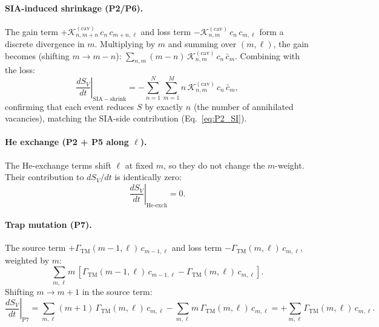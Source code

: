 \documentclass[pdflatex,sn-basic]{sn-jnl} %
\begin{document}
\paragraph{SIA-induced shrinkage (P2/P6).}
The gain term $+\mathcal{K}_{n,m+n}^{(\mathrm{cav})}\,c_n\,c_{m+n,\ell}$
and loss term $-\mathcal{K}_{n,m}^{(\mathrm{cav})}\,c_n\,c_{m,\ell}$
form a discrete divergence in $m$. Multiplying by $m$ and summing over
$(m,\ell)$, the gain becomes (shifting $m \to m-n$):
$\sum_{n,m}(m{-}n)\,\mathcal{K}_{n,m}^{(\mathrm{cav})}\,c_n\,\bar{c}_m$.
Combining with the loss:
\begin{equation}\label{eq:P2i_SV}
    \left.\frac{dS_V}{dt}\right|_{\mathrm{SIA-shrink}}
    = -\sum_{n=1}^{N}\sum_{m=1}^{M}
      n\,\mathcal{K}_{n,m}^{(\mathrm{cav})}\,c_n\,\bar{c}_m,
\end{equation}
confirming that each event reduces $S$ by exactly $n$ (the number of
annihilated vacancies), matching the SIA-side contribution
(Eq.~\ref{eq:P2_SI}).

\paragraph{He exchange (P2 + P5 along $\ell$).}
The He-exchange terms shift $\ell$ at fixed $m$, so they do not change the
$m$-weight. Their contribution to $dS_V/dt$ is identically zero:
\begin{equation}
    \left.\frac{dS_V}{dt}\right|_{\text{He-exch}} = 0.
\end{equation}

\paragraph{Trap mutation (P7).}
The source term $+\Gamma_{\mathrm{TM}}(m{-}1,\ell)\,c_{m-1,\ell}$ and loss
term $-\Gamma_{\mathrm{TM}}(m,\ell)\,c_{m,\ell}$, weighted by $m$:
\begin{equation}
    \sum_{m,\ell} m\,[\Gamma_{\mathrm{TM}}(m{-}1,\ell)\,c_{m-1,\ell}
    - \Gamma_{\mathrm{TM}}(m,\ell)\,c_{m,\ell}].
\end{equation}
Shifting $m \to m+1$ in the source term:
\begin{equation}\label{eq:P7_SV}
    \left.\frac{dS_V}{dt}\right|_{\mathrm{P7}}
    = \sum_{m,\ell}(m{+}1)\,\Gamma_{\mathrm{TM}}(m,\ell)\,c_{m,\ell}
    - \sum_{m,\ell} m\,\Gamma_{\mathrm{TM}}(m,\ell)\,c_{m,\ell}
    = +\sum_{m,\ell}\Gamma_{\mathrm{TM}}(m,\ell)\,c_{m,\ell}.
\end{equation}
\end{document}
